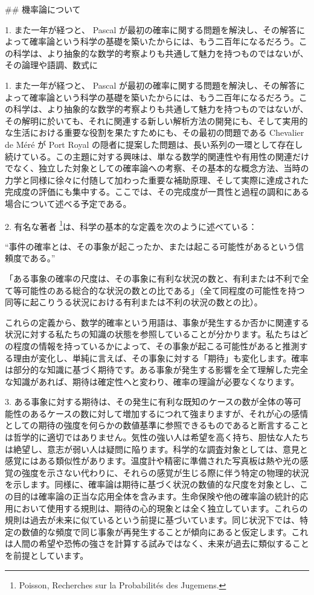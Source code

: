 \documentclass[a4paper,11pt,openany]{ltjsbook}
\begin{document}
\#\# 機率論について

1. また一年が経つと、 Pascal が最初の確率に関する問題を解決し、その解答によって確率論という科学の基礎を築いたからには、もう二百年になるだろう。この科学は、より抽象的な数学的考察よりも共通して魅力を持つものではないが、その論理や語調、数式に

1. また一年が経つと、 Pascal が最初の確率に関する問題を解決し、その解答によって確率論という科学の基礎を築いたからには、もう二百年になるだろう。この科学は、より抽象的な数学的考察よりも共通して魅力を持つものではないが、その解明に於いても、それに関連する新しい解析方法の開発にも、そして実用的な生活における重要な役割を果たすためにも、その最初の問題である Chevalier de Méré が Port Royal の隠者に提案した問題は、長い系列の一環として存在し続けている。この主題に対する興味は、単なる数学的関連性や有用性の関連だけでなく、独立した対象としての確率論への考察、その基本的な概念方法、当時の力学と同様に徐々に付随して加わった重要な補助原理、そして実際に達成された完成度の評価にも集中する。ここでは、その完成度が一貫性と過程の調和にある場合について述べる予定である。

2. 有名な著者%
\footnote{Poisson, Recherches sur la Probabilités des Jugemens.}は、科学の基本的な定義を次のように述べている：

``事件の確率とは、その事象が起こったか、または起こる可能性があるという信頼度である。''

「ある事象の確率の尺度は、その事象に有利な状況の数と、有利または不利で全て等可能性のある総合的な状況の数との比である」（全て同程度の可能性を持つ同等に起こりうる状況における有利または不利の状況の数との比）。

これらの定義から、数学的確率という用語は、事象が発生するか否かに関連する状況に対する私たちの知識の状態を参照していることが分かります。私たちはどの程度の情報を持っているかによって、その事象が起こる可能性があると推測する理由が変化し、単純に言えば、その事象に対する「期待」も変化します。確率は部分的な知識に基づく期待です。ある事象が発生する影響を全て理解した完全な知識があれば、期待は確定性へと変わり、確率の理論が必要なくなります。

3. ある事象に対する期待は、その発生に有利な既知のケースの数が全体の等可能性のあるケースの数に対して増加するにつれて強まりますが、それが心の感情としての期待の強度を何らかの数値基準に参照できるものであると断言することは哲学的に適切ではありません。気性の強い人は希望を高く持ち、胆怯な人たちは絶望し、意志が弱い人は疑問に陥ります。科学的な調査対象としては、意見と感覚にはある類似性があります。温度計や精密に準備された写真板は熱や光の感覚の強度を示さない代わりに、それらの感覚が生じる際に伴う特定の物理的状況を示します。同様に、確率論は期待に基づく状況の数値的な尺度を対象とし、この目的は確率論の正当な応用全体を含みます。生命保険や他の確率論の統計的応用において使用する規則は、期待の心的現象とは全く独立しています。これらの規則は過去が未来に似ているという前提に基づいています。同じ状況下では、特定の数値的な頻度で同じ事象が再発生することが傾向にあると仮定します。これは人間の希望や恐怖の強さを計算する試みではなく、未来が過去に類似することを前提としています。
\end{document}
